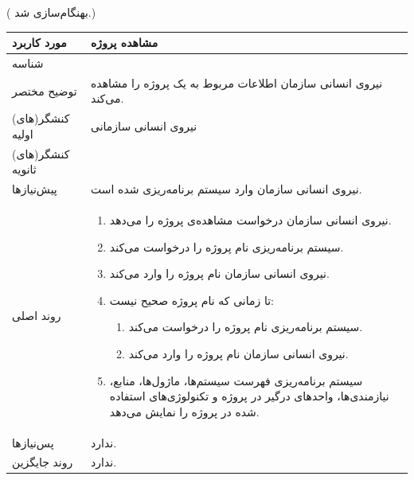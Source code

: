 \newpage
({\color{red} بهنگام‌سازی شد.})
\begin{table}[H]
	\centering
	\begin{tabular}{|p{3cm}|p{10cm}|}
		\hline
		
		مورد کاربرد & مشاهده پروژه  \\
		\hline
		
		شناسه & 
		\stepcounter{usecase_ID}
		
		\arabic{usecase_ID} \\
		\hline
		
		توضیح مختصر & نیروی انسانی سازمان اطلاعات مربوط به یک پروژه را مشاهده می‌کند. \\
		\hline
		
		کنشگر(های) اولیه & نیروی انسانی سازمانی \\
		\hline
		
		کنشگر(های) ثانویه &  \\
		\hline
		
		پیش‌نیازها & نیروی انسانی سازمان وارد سیستم برنامه‌ریزی شده است. \\
		\hline
		
		
		روند اصلی &
		\begin{enumerate}[topsep=0cm,leftmargin=0.5cm]
			
			\item نیروی انسانی سازمان درخواست مشاهده‌ی پروژه را می‌دهد. 
			\item سیستم برنامه‌ریزی نام پروژه را درخواست می‌کند. 
			\item نیروی انسانی سازمان نام پروژه را وارد می‌کند. 
			\item تا زمانی که نام پروژه صحیح نیست: 
			\begin{enumerate}[topsep=0cm,leftmargin=0.5cm]
				\item سیستم برنامه‌ریزی نام پروژه را درخواست می‌کند. 
				\item نیروی انسانی سازمان نام پروژه را وارد می‌کند.
			\end{enumerate}
			\item سیستم برنامه‌ریزی فهرست سیستم‌ها، ماژول‌ها، منابع، نیازمندی‌ها، واحدهای درگیر در پروژه و تکنولوژی‌های استفاده شده در پروژه را نمایش می‌دهد.
		\end{enumerate} \\
		\hline
		
		
		پس‌نیازها & ندارد. \\
		\hline
		
		روند جایگزین & ندارد. \\
		\hline
		
	\end{tabular}
\end{table}


